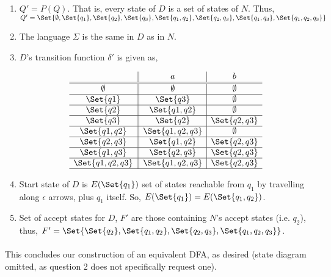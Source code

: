 \documentclass{article}
\begin{document}
\begin{enumerate}
    \item $Q' = P(Q)$.  That is, every state of $D$ is a set of states of $N$.  Thus, $Q' = \Set{\emptyset, \Set{q_1}, \Set{q_2}, \Set{q_3}, \Set{q_1,q_2}, \Set{q_2,q_3}, \Set{q_1,q_3}, \Set{q_1,q_2,q_3}}$
    \item The language $\Sigma$ is the same in $D$ as in $N$.
    \item $D$'s transition function $\delta'$ is given as,
    
\begin{figure}[H]
\centering

\[
\begin{array}{c||c|c}
         & a & b \\ \hline \hline 
        \emptyset & \emptyset & \emptyset \\ \hline 
        \Set{q1} & \Set{q3} & \emptyset \\ \hline 
        \Set{q2} & \Set{q1,q2} & \emptyset \\ \hline 
        \Set{q3} & \Set{q2} & \Set{q2,q3} \\ \hline 
        \Set{q1,q2} & \Set{q1,q2,q3} & \emptyset \\ \hline 
        \Set{q2,q3} & \Set{q1,q2} & \Set{q2,q3} \\ \hline 
        \Set{q1,q3} & \Set{q2,q3} & \Set{q2,q3} \\ \hline 
        \Set{q1,q2,q3} & \Set{q1,q2,q3} & \Set{q2,q3} \\ \hline 
\end{array}
\]

\caption{}
\label{fig:mylabel}
\end{figure}

    
    \item Start state of $D$ is $E(\Set{q_1})$ set of states reachable from $q_1$ by travelling along $\epsilon$ arrows, plus $q_1$ itself.  So, $E(\Set{q_1}) = E(\Set{q_1,q_2})$.
    \item Set of accept states for $D$, $F'$ are those containing $N$'s accept states (i.e. $q_2$), thus, $F' = \Set{\Set{q_2}, \Set{q_1,q_2}, \Set{q_2,q_3}, \Set{q_1,q_2,q_3}}$.
\end{enumerate}

\paragraph{}

This concludes our construction of an equivalent DFA, as desired (state diagram omitted, as question 2 does not specifically request one).  
\end{document}
